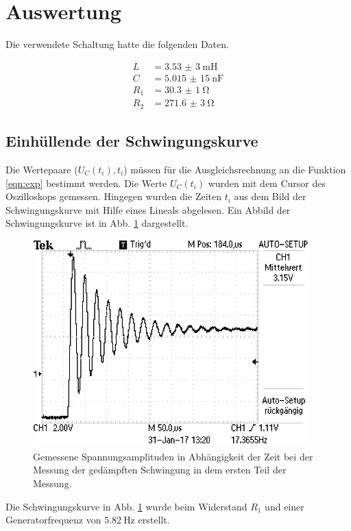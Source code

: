 
\section{Auswertung}

Die verwendete Schaltung hatte die folgenden Daten.

\begin{align*}
  L &= \SI{3,53(3)}{\milli\henry} \\
  C &= \SI{5,015(15)}{\nano\farad} \\
  R_1 &= \SI{30,3(1)}{\ohm} \\
  R_2 &= \SI{271,6(3)}{\ohm}
\end{align*}

\subsection{Einhüllende der Schwingungskurve}

Die Wertepaare ($U_C(t_i), t_i$) müssen für die Ausgleichsrechnung an die Funktion
\eqref{eqn:exp} bestimmt werden.
Die Werte $U_C(t_i)$ wurden mit dem Cursor des Oszilloskops gemessen.
Hingegen wurden die Zeiten $t_i$ aus dem Bild der Schwingungskurve mit
Hilfe eines Lineals abgelesen. Ein Abbild der Schwingungskurve ist in Abb.
\ref{fig:Schwingungskurve} dargestellt.

\begin{figure}
  \centering
  \includegraphics[width=\textwidth, angle=90, height=8cm]{F0001TEK.JPG}
  \caption{Gemessene Spannungsamplituden in Abhängigkeit der Zeit bei der Messung
  der gedämpften Schwingung in dem ersten Teil der Messung.}
  \label{fig:Schwingungskurve}
\end{figure}

Die Schwingungskurve in Abb. \ref{fig:Schwingungskurve} wurde beim
Widerstand $R_1$ und einer Generatorfrequenz von $\SI{5,82}{\hertz}$ erstellt.

